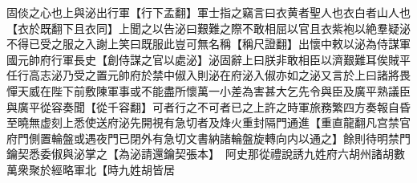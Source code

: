 固倓之心也上與泌出行軍【行下孟翻】軍士指之竊言曰衣黄者聖人也衣白者山人也【衣於既翻下且衣同】上聞之以告泌曰艱難之際不敢相屈以官且衣紫袍以絶羣疑泌不得已受之服之入謝上笑曰既服此豈可無名稱【稱尺證翻】出懷中敕以泌為侍謀軍國元帥府行軍長史【創侍謀之官以處泌】泌固辭上曰朕非敢相臣以濟艱難耳俟賊平任行高志泌乃受之置元帥府於禁中俶入則泌在府泌入俶亦如之泌又言於上曰諸將畏憚天威在陛下前敷陳軍事或不能盡所懷萬一小差為害甚大乞先令與臣及廣平熟議臣與廣平從容奏聞【從千容翻】可者行之不可者已之上許之時軍旅務繁四方奏報自昏至曉無虚刻上悉使送府泌先開視有急切者及烽火重封隔門通進【重直龍翻凡宫禁官府門側置輪盤或遇夜門已閉外有急切文書納諸輪盤旋轉向内以通之】餘則待明禁門鑰契悉委俶與泌掌之【為泌請還鑰契張本】　阿史那從禮說誘九姓府六胡州諸胡數萬衆聚於經略軍北【時九姓胡皆居